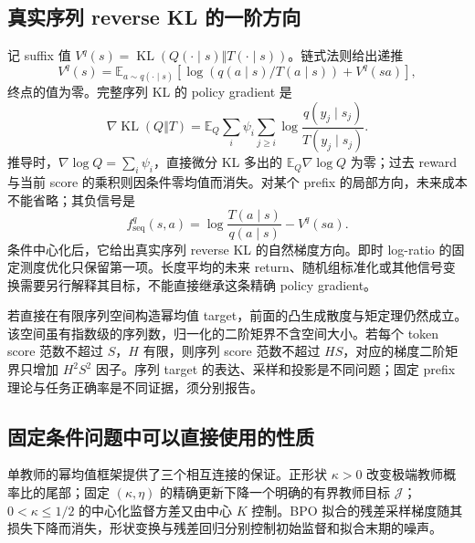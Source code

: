 \documentclass[lang=cn,scheme=chinese,openany]{../book/elegantbook}
\newcommand{\E}{\mathbb E}
\newcommand{\KL}{\operatorname{KL}}
\begin{document}
\subsection{真实序列 reverse KL 的一阶方向}

记 suffix 值 $V^q(s)=\KL(Q(\cdot\mid s)\Vert T(\cdot\mid s))$。链式法则给出递推
\begin{equation}
 V^q(s)=\E_{a\sim q(\cdot\mid s)}[\log(q(a\mid s)/T(a\mid s))+V^q(sa)],
\end{equation}
终点的值为零。完整序列 KL 的 policy gradient 是
\begin{equation}
 \nabla\KL(Q\Vert T)
 =\E_Q\sum_i\psi_i\sum_{j\ge i}\log\frac{q(y_j\mid s_j)}{T(y_j\mid s_j)}.
\end{equation}
推导时，$\nabla\log Q=\sum_i\psi_i$，直接微分 KL 多出的 $\E_Q\nabla\log Q$ 为零；过去 reward 与当前 score 的乘积则因条件零均值而消失。对某个 prefix 的局部方向，未来成本不能省略；其负信号是
\begin{equation}
 f_{\mathrm{seq}}^q(s,a)=\log\frac{T(a\mid s)}{q(a\mid s)}-V^q(sa).
\end{equation}
条件中心化后，它给出真实序列 reverse KL 的自然梯度方向。即时 log-ratio 的固定测度优化只保留第一项。长度平均的未来 return、随机组标准化或其他信号变换需要另行解释其目标，不能直接继承这条精确 policy gradient。

若直接在有限序列空间构造幂均值 target，前面的凸生成散度与矩定理仍然成立。该空间虽有指数级的序列数，归一化的二阶矩界不含空间大小。若每个 token score 范数不超过 $S$，$H$ 有限，则序列 score 范数不超过 $HS$，对应的梯度二阶矩界只增加 $H^2S^2$ 因子。序列 target 的表达、采样和投影是不同问题；固定 prefix 理论与任务正确率是不同证据，须分别报告。



\subsection{固定条件问题中可以直接使用的性质}

单教师的幂均值框架提供了三个相互连接的保证。正形状 $\kappa>0$ 改变极端教师概率比的尾部；固定 $(\kappa,\eta)$ 的精确更新下降一个明确的有界教师目标 $\mathcal J$；$0<\kappa\le1/2$ 的中心化监督方差又由中心 $K$ 控制。BPO 拟合的残差采样梯度随其损失下降而消失，形状变换与残差回归分别控制初始监督和拟合末期的噪声。
\end{document}
